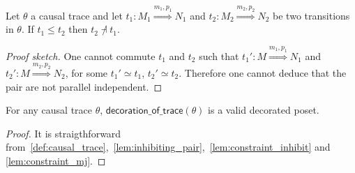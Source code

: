 \begin{lemma}
  \label{lem:constraint_inhibit}
  Let $\theta$ a causal trace and let $t_1:M_1\overset{m_1,p_1}{\Rightarrow}N_1$ and $t_2:M_2\overset{m_2,p_2}{\Rightarrow}N_2$ be two transitions in $\theta$.
  If $t_1 \leq t_2$ then $t_2\not\dashv t_1$.
\end{lemma}
\begin{proof}[Proof sketch]
  One cannot commute $t_1$ and $t_2$ such that $t_1':M\overset{m_1,p_1}{\Rightarrow}N_1$ and $t_2':M\overset{m_2,p_2}{\Rightarrow}N_2$, for some $t_1'\simeq t_1$, $t_2'\simeq t_2$. Therefore one cannot deduce that the pair are not parallel independent.
\end{proof}


\begin{lemma}
  \label{prop:constraints_poset}
  For any causal trace $\theta$, $\mathsf{decoration\_of\_trace}(\theta)$ is a valid decorated poset.
\end{lemma}
\begin{proof}
  It is straigthforward from~\autoref{def:causal_trace},~\autoref{lem:inhibiting_pair},~\autoref{lem:constraint_inhibit} and \autoref{lem:constraint_mj}.
\end{proof}
